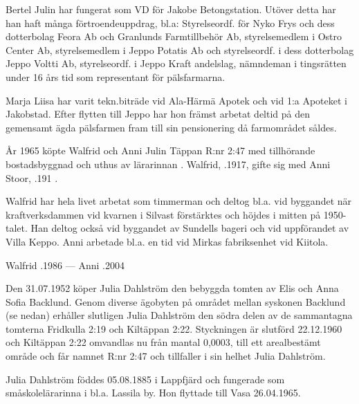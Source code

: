 Bertel Julin har fungerat som VD för Jakobe Betongstation. Utöver detta har han haft många förtroendeuppdrag, bl.a: Styrelseordf. för Nyko Frys och dess dotterbolag Feora Ab och Granlunds Farmtillbehör Ab, styrelsemedlem i Ostro Center Ab, styrelsemedlem i Jeppo Potatis Ab och styrelseordf. i dess dotterbolag Jeppo Voltti Ab, styrelseordf. i Jeppo Kraft andelslag, nämndeman i tingsrätten under 16 års tid som representant för pälsfarmarna.

Marja Liisa har varit tekn.biträde vid Ala-Härmä Apotek och vid 1:a Apoteket i Jakobstad. Efter flytten till Jeppo har hon främst arbetat deltid på den gemensamt ägda pälsfarmen fram till sin pensionering då farmområdet såldes.



År 1965 köpte Walfrid och Anni Julin Täppan R:nr 2:47 med tillhörande bostadsbyggnad och uthus av lärarinnan . Walfrid, .1917, gifte sig med Anni Stoor, .191 .

Walfrid har hela livet arbetat som timmerman och deltog bl.a. vid byggandet när kraftverksdammen vid kvarnen i Silvast förstärktes och höjdes i mitten på 1950-talet. Han deltog också vid byggandet av Sundells bageri och vid uppförandet av Villa Keppo. Anni arbetade bl.a. en tid vid Mirkas fabriksenhet vid Kiitola.

Walfrid .1986  ---  Anni .2004




Den 31.07.1952 köper Julia Dahlström den bebyggda tomten av Elis och Anna Sofia Backlund. Genom diverse ägobyten på området mellan syskonen Backlund (se nedan) erhåller slutligen Julia Dahlström den södra delen av de sammantagna tomterna Fridkulla 2:19 och Kiltäppan 2:22. Styckningen är slutförd 22.12.1960 och Kiltäppan 2:22 omvandlas nu från mantal 0,0003, till ett arealbestämt område och får namnet  R:nr 2:47 och tillfaller i sin helhet Julia Dahlström.

Julia Dahlström föddes 05.08.1885 i Lappfjärd och fungerade som småskolelärarinna i bl.a. Lassila by. Hon flyttade till Vasa 26.04.1965.


